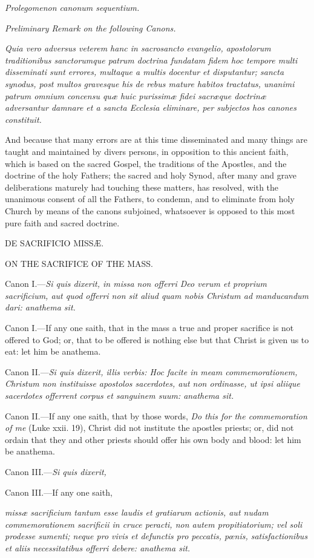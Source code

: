 \emph{Prolegomenon canonum sequentium.}

\emph{Preliminary Remark on the following Canons.}

\emph{Quia vero adversus veterem hanc in sacrosancto evangelio, apostolorum traditionibus sanctorumque patrum doctrina fundatam fidem hoc tempore multi disseminati sunt errores, multaque a multis docentur et disputantur; sancta synodus, post multos gravesque his de rebus mature habitos tractatus, unanimi patrum omnium concensu quæ huic purissimæ fidei sacræque doctrinæ adversantur damnare et a sancta Ecclesia eliminare, per subjectos hos canones constituit.}

And because that many errors are at this time disseminated and many things are taught and maintained by divers persons, in opposition to this ancient faith, which is based on the sacred Gospel, the traditions of the Apostles, and the doctrine of the holy Fathers; the sacred and holy Synod, after many and grave deliberations maturely had touching these matters, has resolved, with the unanimous consent of all the Fathers, to condemn, and to eliminate from holy Church by means of the canons subjoined, whatsoever is opposed to this most pure faith and sacred doctrine.

DE SACRIFICIO MISSÆ.

ON THE SACRIFICE OF THE MASS.

Canon I.—\emph{Si quis dixerit, in missa non offerri Deo verum et proprium sacrificium, aut quod offerri non sit aliud quam nobis Christum ad manducandum dari: anathema sit.}

Canon I.—If any one saith, that in the mass a true and proper sacrifice is not offered to God; or, that to be offered is nothing else but that Christ is given us to eat: let him be anathema.

Canon II.—\emph{Si quis dixerit, illis verbis: Hoc facite in meam commemorationem, Christum non instituisse apostolos sacerdotes, aut non ordinasse, ut ipsi aliique sacerdotes offerrent corpus et sanguinem suum: anathema sit.}

Canon II.—If any one saith, that by those words, \emph{Do this for the commemoration of me} (Luke xxii. 19), Christ did not institute the apostles priests; or, did not ordain that they and other priests should offer his own body and blood: let him be anathema.

Canon III.—\emph{Si quis dixerit, }

Canon III.—If any one saith,

\emph{missæ sacrificium tantum esse laudis et gratiarum actionis, aut nudam commemorationem sacrificii in cruce peracti, non autem propitiatorium; vel soli prodesse sumenti; neque pro vivis et defunctis pro peccatis, pœnis, satisfactionibus et aliis necessitatibus offerri debere: anathema sit.}


